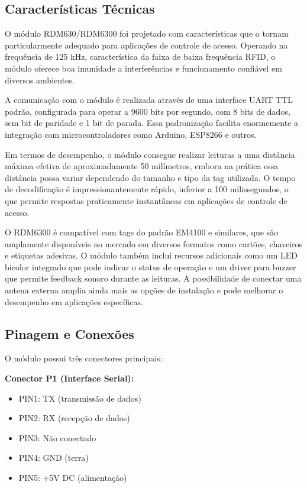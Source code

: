 \subsection{Características Técnicas}

O módulo RDM630/RDM6300 foi projetado com características que o tornam particularmente adequado para aplicações de controle de acesso. Operando na frequência de 125 kHz, característica da faixa de baixa frequência RFID, o módulo oferece boa imunidade a interferências e funcionamento confiável em diversos ambientes.

A comunicação com o módulo é realizada através de uma interface UART TTL padrão, configurada para operar a 9600 bits por segundo, com 8 bits de dados, sem bit de paridade e 1 bit de parada. Essa padronização facilita enormemente a integração com microcontroladores como Arduino, ESP8266 e outros.

Em termos de desempenho, o módulo consegue realizar leituras a uma distância máxima efetiva de aproximadamente 50 milímetros, embora na prática essa distância possa variar dependendo do tamanho e tipo da tag utilizada. O tempo de decodificação é impressionantemente rápido, inferior a 100 milissegundos, o que permite respostas praticamente instantâneas em aplicações de controle de acesso.

O RDM6300 é compatível com tags do padrão EM4100 e similares, que são amplamente disponíveis no mercado em diversos formatos como cartões, chaveiros e etiquetas adesivas. O módulo também inclui recursos adicionais como um LED bicolor integrado que pode indicar o status de operação e um driver para buzzer que permite feedback sonoro durante as leituras. A possibilidade de conectar uma antena externa amplia ainda mais as opções de instalação e pode melhorar o desempenho em aplicações específicas.

\subsection{Pinagem e Conexões}

O módulo possui três conectores principais:

\textbf{Conector P1 (Interface Serial):}
\begin{itemize}
\item PIN1: TX (transmissão de dados)
\item PIN2: RX (recepção de dados)
\item PIN3: Não conectado
\item PIN4: GND (terra)
\item PIN5: +5V DC (alimentação)
\end{itemize}

